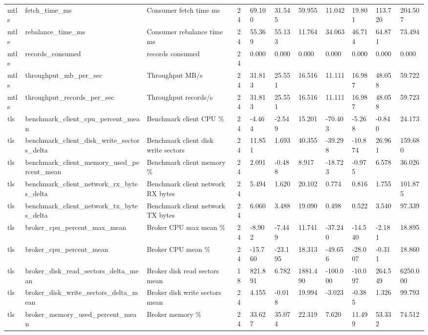 \begin{tabular}{lllllllllll}
mtls & fetch\_time\_ms & Consumer fetch time ms & 24 & 69.100 & 31.545 & 59.955 & 11.042 & 19.801 & 113.720 & 204.507 \\
mtls & rebalance\_time\_ms & Consumer rebalance time ms & 24 & 55.369 & 55.133 & 11.764 & 34.063 & 46.714 & 64.871 & 73.494 \\
mtls & records\_consumed & records consumed & 24 & 0.000 & 0.000 & 0.000 & 0.000 & 0.000 & 0.000 & 0.000 \\
mtls & throughput\_mb\_per\_sec & Throughput MB/s & 24 & 31.813 & 25.551 & 16.516 & 11.111 & 16.987 & 48.058 & 59.722 \\
mtls & throughput\_records\_per\_sec & Throughput records/s & 24 & 31.813 & 25.551 & 16.516 & 11.111 & 16.987 & 48.058 & 59.723 \\
tls & benchmark\_client\_cpu\_percent\_mean & Benchmark client CPU \% & 24 & -4.464 & -2.549 & 15.201 & -70.403 & -5.268 & -0.840 & 24.173 \\
tls & benchmark\_client\_disk\_write\_sectors\_delta & Benchmark client disk write sectors & 24 & 11.851 & 1.693 & 40.355 & -39.298 & -10.874 & 26.961 & 159.680 \\
tls & benchmark\_client\_memory\_used\_percent\_mean & Benchmark client memory \% & 24 & 2.091 & -0.488 & 8.917 & -18.723 & -0.975 & 6.578 & 36.026 \\
tls & benchmark\_client\_network\_rx\_bytes\_delta & Benchmark client network RX bytes & 24 & 5.494 & 1.620 & 20.102 & 0.774 & 0.816 & 1.755 & 101.875 \\
tls & benchmark\_client\_network\_tx\_bytes\_delta & Benchmark client network TX bytes & 24 & 6.060 & 3.488 & 19.090 & 0.498 & 0.522 & 3.540 & 97.339 \\
tls & broker\_cpu\_percent\_max\_mean & Broker CPU max mean \% & 24 & -8.902 & -7.449 & 11.741 & -37.240 & -14.540 & -2.181 & 18.895 \\
tls & broker\_cpu\_percent\_mean & Broker CPU mean \% & 24 & -15.760 & -23.195 & 18.313 & -49.656 & -28.007 & -0.311 & 18.860 \\
tls & broker\_disk\_read\_sectors\_delta\_mean & Broker disk read sectors mean & 18 & 821.891 & 6.782 & 1881.490 & -100.000 & -10.097 & 264.549 & 6250.000 \\
tls & broker\_disk\_write\_sectors\_delta\_mean & Broker disk write sectors mean & 24 & 4.155 & -0.018 & 19.994 & -3.023 & -0.385 & 1.326 & 99.793 \\
tls & broker\_memory\_used\_percent\_mean & Broker memory \% & 24 & 33.627 & 35.074 & 22.319 & 7.620 & 11.499 & 53.332 & 74.512 \\

\end{tabular}
